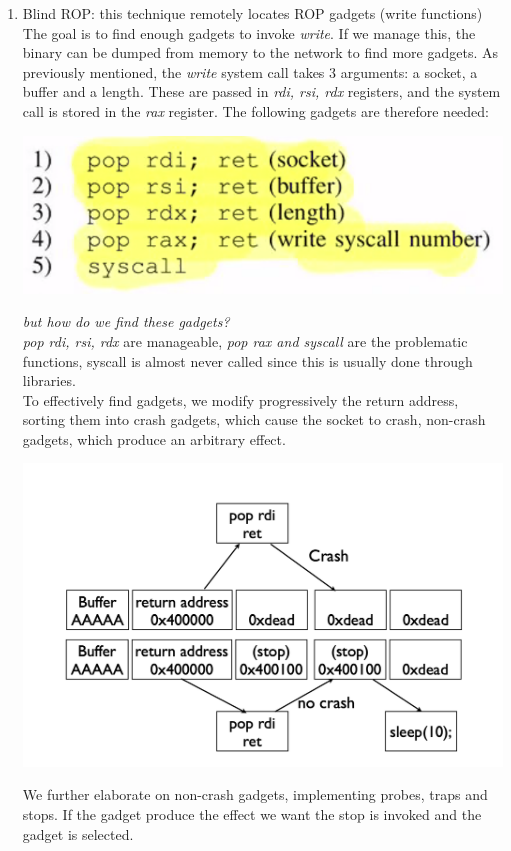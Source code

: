 \documentclass[11pt, oneside]{article}   	%
\begin{document}
\begin{enumerate}
\item Blind ROP: this technique remotely locates ROP gadgets (write functions)
The goal is to find enough gadgets to invoke \emph{write}. If we manage this, the binary can be dumped from memory to the network to find more gadgets. As previously mentioned, the \emph{write} system call takes 3 arguments: a socket, a buffer and a length. These are passed in \emph{rdi, rsi, rdx} registers, and the system call is stored in the \emph{rax} register. The following gadgets are therefore needed:
\begin{center}
\includegraphics[scale = 0.5]{gadg}
\end{center}
\emph{but how do we find these gadgets?}\\
\emph{pop rdi, rsi, rdx} are manageable, \emph{pop rax and syscall} are the problematic functions, syscall is almost never called since this is usually done through libraries.\\
To effectively find gadgets, we modify progressively the return address, sorting them into crash gadgets, which cause the socket to crash, non-crash gadgets, which produce an arbitrary effect. 
\begin{center}
\includegraphics[scale = 0.5]{cgadg}
\end{center}
We further elaborate on non-crash gadgets, implementing probes, traps and stops. If the gadget produce the effect we want the stop is invoked and the gadget is selected.

\end{enumerate}
\end{document}
